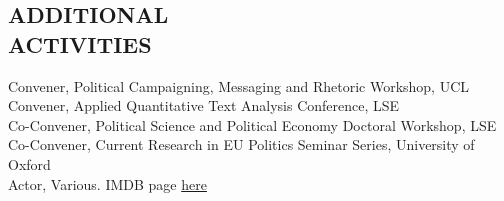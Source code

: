 \documentclass[centered]{res}
\begin{document}
\begin{resume}
\section{ADDITIONAL \\ ACTIVITIES}             

\vspace{.5cm}

            Convener, Political Campaigning, Messaging and Rhetoric Workshop, UCL \\
            Convener, Applied Quantitative Text Analysis Conference, LSE \\
            Co-Convener, Political Science and Political Economy Doctoral Workshop, LSE \\
            Co-Convener, Current Research in EU Politics Seminar Series, University of Oxford \\
            Actor, Various. IMDB page \href{http://www.imdb.com/name/nm0089773/?ref_=nmbio_bio_nm}{here}
 

\end{resume}
\end{document}

